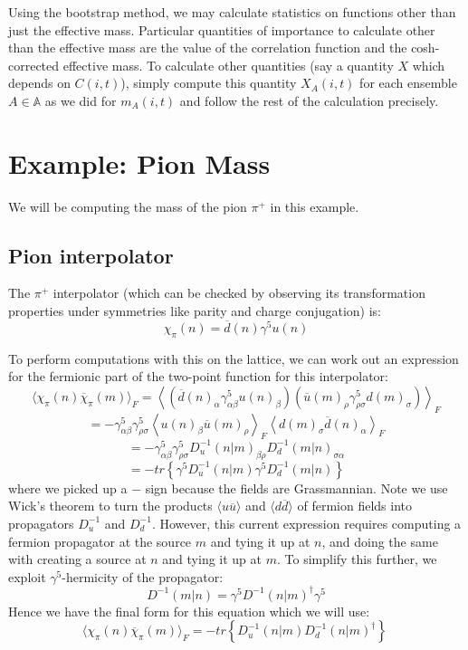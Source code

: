 \documentclass[11pt, oneside]{article}   	%
\theoremstyle{definition}
\begin{document}
Using the bootstrap method, we may calculate statistics on functions other than just the effective mass. Particular 
quantities of importance to calculate other than the effective mass are the value of the correlation function and the 
cosh-corrected effective mass. To calculate other quantities (say a quantity $X$ which depends on $C(i, t)$), simply 
compute this quantity $X_A(i, t)$ for each ensemble $A\in\mathbb A$ as we did for $m_A(i, t)$ and follow the rest of 
the calculation precisely. 

\newpage
\section{Example: Pion Mass}

We will be computing the mass of the pion $\pi^+$ in this example.

\subsection{Pion interpolator}

The $\pi^+$ interpolator (which can be checked by observing its transformation properties under symmetries like parity 
and charge conjugation) is:
\begin{equation}
	\chi_\pi(n) = \overline d(n)\gamma^5 u(n)
\end{equation}

To perform computations with this on the lattice, we can work out an expression for the fermionic part of the 
two-point function for this interpolator:
$$
	\langle\chi_\pi(n)\overline\chi_\pi(m)\rangle_F = \left\langle \left(\overline d(n)_\alpha \gamma^5_{\alpha\beta} 
	u(n)_\beta\right)\left(\overline u(m)_\rho\gamma^5_{\rho\sigma} d(m)_\sigma\right)\right\rangle_F
$$
$$
	= -\gamma^5_{\alpha\beta}\gamma^5_{\rho\sigma}\left\langle u(n)_\beta \overline u(m)_\rho\right\rangle_F
	\left\langle d(m)_\sigma\overline d(n)_\alpha\right\rangle_F
$$
$$
	= -\gamma_{\alpha\beta}^5\gamma_{\rho\sigma}^5 D^{-1}_u(n | m)_{\beta\rho} D^{-1}_d (m | n)_{\sigma\alpha}
$$
$$
	= -tr\left\{\gamma^5 D^{-1}_u (n | m) \gamma^5 D^{-1}_d (m | n)\right\}
$$
where we picked up a $-$ sign because the fields are Grassmannian. Note we use Wick's theorem to turn the products 
$\langle u \overline u\rangle$ and $\langle d\overline d\rangle$ of fermion fields into propagators $D^{-1}_u$ and 
$D^{-1}_d$. However, this current expression requires computing a fermion propagator at the source $m$ and tying 
it up at $n$, and doing the same with creating a source at $n$ and tying it up at $m$. To simplify this further, we 
exploit $\gamma^5$-hermicity of the propagator:
\begin{equation}
	D^{-1}(m | n) = \gamma^5 D^{-1}(n | m)^\dagger\gamma^5
\end{equation}
Hence we have the final form for this equation which we will use:
\begin{equation}
	\langle\chi_\pi(n)\overline\chi_\pi(m)\rangle_F = - tr\left\{D^{-1}_u (n | m) D^{-1}_d (n | m)^\dagger\right\}~
	\label{eq:correlator}
\end{equation}
\end{document}

